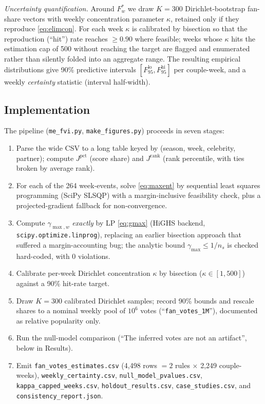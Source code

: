 \documentclass[11pt]{article}
\begin{document}
\emph{Uncertainty quantification.} Around $F^*_w$ we draw $K=300$ Dirichlet-bootstrap
fan-share vectors with weekly concentration parameter $\kappa$, retained only if they
reproduce \eqref{eq:elimcon}. For each week $\kappa$ is calibrated by bisection so that
the reproduction (``hit'') rate reaches $\ge 0.90$ where feasible; weeks whose $\kappa$
hits the estimation cap of 500 without reaching the target are flagged and enumerated
rather than silently folded into an aggregate range. The resulting empirical
distributions give 90\% predictive intervals $[F^{\text{lo}}_{95}, F^{\text{hi}}_{95}]$
per couple-week, and a weekly \emph{certainty} statistic (interval half-width).

\subsection{Implementation}

The pipeline (\texttt{me\_fvi.py}, \texttt{make\_figures.py}) proceeds in seven stages:

\begin{enumerate}[itemsep=1pt]
  \item Parse the wide CSV to a long table keyed by (season, week, celebrity, partner);
        compute $J^{\text{pct}}$ (score share) and $J^{\text{rank}}$ (rank percentile,
        with ties broken by average rank).
  \item For each of the 264 week-events, solve \eqref{eq:maxent} by sequential least
        squares programming (SciPy SLSQP) with a margin-inclusive feasibility check, plus
        a projected-gradient fallback for non-convergence.
  \item Compute $\gamma_{\max,w}$ \emph{exactly} by LP \eqref{eq:gmax} (HiGHS backend,
        \texttt{scipy.optimize.linprog}), replacing an earlier bisection approach that
        suffered a margin-accounting bug; the analytic bound $\gamma_{\max} \le 1/n_s$
        is checked hard-coded, with 0 violations.
  \item Calibrate per-week Dirichlet concentration $\kappa$ by bisection
        ($\kappa \in [1, 500]$) against a 90\% hit-rate target.
  \item Draw $K=300$ calibrated Dirichlet samples; record 90\% bounds and rescale shares
        to a nominal weekly pool of $10^6$ votes (``\texttt{fan\_votes\_1M}''),
        documented as relative popularity only.
  \item Run the null-model comparison (``The inferred votes are not an artifact'',
        below in Results).
  \item Emit \texttt{fan\_votes\_estimates.csv} (4{,}498 rows $= 2$ rules $\times$ 2{,}249
        couple-weeks), \texttt{weekly\_certainty.csv}, \texttt{null\_model\_pvalues.csv},
        \texttt{kappa\_capped\_weeks.csv}, \texttt{holdout\_results.csv},
        \texttt{case\_studies.csv}, and \texttt{consistency\_report.json}.
\end{enumerate}
\end{document}
